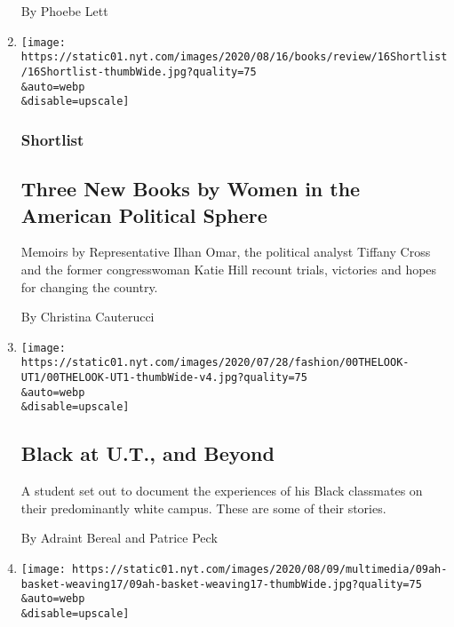 \begin{enumerate}
  By Phoebe Lett
\item
  \href{/2020/08/08/books/review/katie-hill-she-will-rise-ilhan-omar-tiffany-cross.html}{}

  \texttt{[image: https://static01.nyt.com/images/2020/08/16/books/review/16Shortlist/16Shortlist-thumbWide.jpg?quality=75\\\&auto=webp\\\&disable=upscale]}

  \hypertarget{shortlist}{%
  \subsubsection{Shortlist}\label{shortlist}}

  \hypertarget{three-new-books-by-women-in-the-american-political-sphere}{%
  \subsection{Three New Books by Women in the American Political
  Sphere}\label{three-new-books-by-women-in-the-american-political-sphere}}

  Memoirs by Representative Ilhan Omar, the political analyst Tiffany
  Cross and the former congresswoman Katie Hill recount trials,
  victories and hopes for changing the country.

  By Christina Cauterucci
\item
  \href{/2020/08/08/style/black-yearbook-university-texas-austin.html}{}

  \texttt{[image: https://static01.nyt.com/images/2020/07/28/fashion/00THELOOK-UT1/00THELOOK-UT1-thumbWide-v4.jpg?quality=75\\\&auto=webp\\\&disable=upscale]}

  \hypertarget{black-at-ut-and-beyond}{%
  \subsection{Black at U.T., and Beyond}\label{black-at-ut-and-beyond}}

  A student set out to document the experiences of his Black classmates
  on their predominantly white campus. These are some of their stories.

  By Adraint Bereal and Patrice Peck
\item
  \href{/2020/08/08/at-home/coronavirus-newspaper-basket.html}{}

  \texttt{[image: https://static01.nyt.com/images/2020/08/09/multimedia/09ah-basket-weaving17/09ah-basket-weaving17-thumbWide.jpg?quality=75\\\&auto=webp\\\&disable=upscale]}

  \hypertarget{turn-your-newspaper-into-a-basket}{%
}
\end{enumerate}
